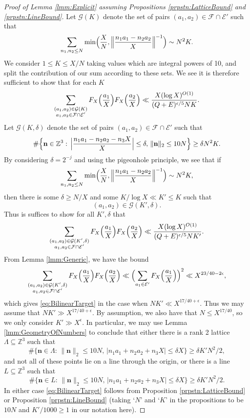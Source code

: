 \documentclass[10pt]{amsart}
\theoremstyle{plain}
\numberwithin{sblmm}{thrm}
\numberwithin{equation}{section}
\begin{document}
\begin{proof}[Proof of Lemma \ref{lmm:Explicit} assuming Propositions \ref{prpstn:LatticeBound} and \ref{prpstn:LineBound}]
Let $\mathcal{G}(K)$ denote the set of pairs $(a_1,a_2)\in\mathcal{F}\cap\mathcal{E}'$ such that
\[
\sum_{n_1,n_2\le N}\min\Bigl(\frac{X}{N},\Bigl\|\frac{n_1a_1-n_2a_2}{X}\Bigr\|^{-1}\Bigr)\sim N^2 K.
\]
We consider $1\le K\le X/N$ taking values which are integral powers of 10, and split the contribution of our sum according to these sets. We see it is therefore sufficient to show that for each $K$
\[
\sum_{\substack{(a_1,a_2)\in\mathcal{G}(K)\\ a_1,a_2\in\mathcal{F}\cap\mathcal{E}'}}F_X\Bigl(\frac{a_1}{X}\Bigr)F_X\Bigl(\frac{a_2}{X}\Bigr)\ll \frac{X(\log{X})^{O(1)}}{(Q+E)^{\epsilon/5} N K}.
\]
Let $\mathcal{G}(K,\delta)$ denote the set of pairs $(a_1,a_2)\in\mathcal{F}\cap\mathcal{E}'$ such that
\[
\#\Bigl\{\mathbf{n}\in\mathbb{Z}^3:\,\Bigl|\frac{n_1a_1-n_2a_2-n_3 X}{X}\Bigr|\le \delta,\,\|\mathbf{n}\|_2\le 10 N\Bigr\}\ge \delta N^2 K.
\]
By considering $\delta=2^{-j}$ and using the pigeonhole principle, we see that if
\[
\sum_{n_1,n_2\le N}\min\Bigl(\frac{X}{N},\Bigl\|\frac{n_1a_1-n_2a_2}{X}\Bigr\|^{-1}\Bigr)\sim N^2 K,
\]
then there is some $\delta\ge N/X$ and some $K/\log{X} \ll K'\le K$ such that
\[
(a_1,a_2)\in\mathcal{G}(K',\delta).
\]
Thus is suffices to show for all $K',\delta$ that
%
\begin{equation}
\sum_{\substack{(a_1,a_2)\in\mathcal{G}(K',\delta)\\ a_1,a_2\in\mathcal{F}\cap\mathcal{E}'}}F_X\Bigl(\frac{a_1}{X}\Bigr)F_X\Bigl(\frac{a_2}{X}\Bigr)
\ll \frac{X(\log{X})^{O(1)}}{(Q+E)^{\epsilon/5} N K'}. 
\label{eq:BilinearTarget}
\end{equation}
%
From Lemma \ref{lmm:Generic}, we have the bound
\[
\sum_{\substack{(a_1,a_2)\in\mathcal{G}(K',\delta)\\ a_1,a_2\in\mathcal{F}\cap\mathcal{E}'}}F_X\Bigl(\frac{a_1}{X}\Bigr)F_X\Bigl(\frac{a_2}{X}\Bigr)\ll \Bigl(\sum_{a_1\in\mathcal{E}'}F_X\Bigl(\frac{a_1}{X}\Bigr)\Bigr)^2\ll X^{23/40-2\epsilon},
\]
which gives \eqref{eq:BilinearTarget} in the case when $N K'\ll X^{17/40+\epsilon}$. Thus we may assume that $N K'\gg X^{17/40+\epsilon}$. By assumption, we also have that $N\le X^{17/40}$, so we only consider $K'\gg X^{\epsilon}$. In particular, we may use Lemma \ref{lmm:GeometryOfNumbers} to conclude that either there is a rank 2 lattice $\Lambda\subseteq\mathbb{Z}^3$ such that 
\[
 \#\{\mathbf{n}\in\Lambda:\,\|\mathbf{n}\|_2\le 10 N,\, |n_1a_1+n_2a_2+n_3 X|\le \delta X\}\ge \delta K' N^2/2,
\]
and not all of these points lie on a line through the origin, or there is a line $L\subseteq\mathbb{Z}^3$ such that
\[
 \#\{\mathbf{n}\in L:\,\|\mathbf{n}\|_2\le 10 N,\, |n_1a_1+n_2a_2+n_3 X|\le \delta X\}\ge \delta K' N^2/2.
\]
In either case \eqref{eq:BilinearTarget} follows from Proposition \ref{prpstn:LatticeBound} or Proposition \ref{prpstn:LineBound} (taking `$N$' and `$K$' in the propositions to be $10N$ and $K'/1000\ge 1$ in our notation here).
%
\end{proof}
\end{document}

